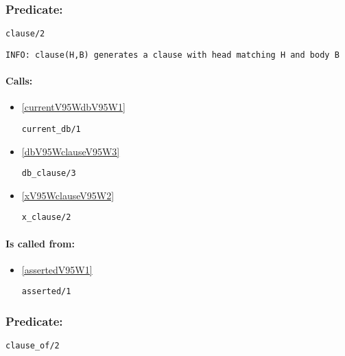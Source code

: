 \subsubsection{Predicate:} \label{clauseV95W2}

\begin{verbatim}
clause/2
\end{verbatim}

{\small \begin{verbatim}
INFO: clause(H,B) generates a clause with head matching H and body B

\end{verbatim}}
\paragraph{Calls:} 
\begin{itemize}
\item \ref{currentV95WdbV95W1} 
\begin{verbatim}
current_db/1
\end{verbatim}

\item \ref{dbV95WclauseV95W3} 
\begin{verbatim}
db_clause/3
\end{verbatim}

\item \ref{xV95WclauseV95W2} 
\begin{verbatim}
x_clause/2
\end{verbatim}

\end{itemize}
\paragraph{Is called from:} 
\begin{itemize}
\item \ref{assertedV95W1} 
\begin{verbatim}
asserted/1
\end{verbatim}

\end{itemize}

\subsubsection{Predicate:} \label{clauseV95WofV95W2}

\begin{verbatim}
clause_of/2
\end{verbatim}

